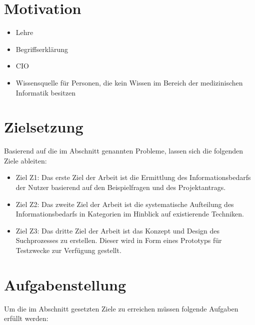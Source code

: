 \section{Motivation}\label{sec:motivation}

\begin{itemize}
\item Lehre
\item Begriffserklärung
\item CIO
\item Wissensquelle für Personen, die kein Wissen im Bereich der medizinischen Informatik besitzen
\end{itemize}

\section{Zielsetzung}\label{sec:zielsetzung}

Basierend auf die im Abschnitt  genannten Probleme, lassen sich die folgenden Ziele ableiten:

\begin{itemize}
\item Ziel Z1: Das erste Ziel der Arbeit ist die Ermittlung des Informationsbedarfs der Nutzer basierend auf den Beispielfragen und des Projektantrags. 
\item Ziel Z2: Das zweite Ziel der Arbeit ist die systematische Aufteilung des Informationsbedarfs in Kategorien im Hinblick auf existierende Techniken.
\item Ziel Z3: Das dritte Ziel der Arbeit ist das Konzept und Design des Suchprozesses zu erstellen. Dieser wird in Form eines Prototyps für Testzwecke zur Verfügung gestellt.
\end{itemize}

\section{Aufgabenstellung}\label{sec:aufgabenstellung}

Um die im Abschnitt  gesetzten Ziele zu erreichen müssen folgende Aufgaben erfüllt werden:

